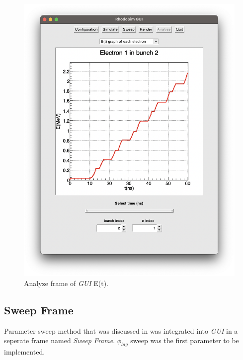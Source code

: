 \documentclass{book}
\begin{document}
\begin{figure}[h!]
    \centering
    \includegraphics[width=0.9\linewidth]{../../../figures/rhodoSim/GUI_analyze_Et_3.png}
    \caption{Analyze frame of \textit{GUI} E(t).}
    \label{fig:gui_analyze_Et}
    \vspace{20pt}
\end{figure}

\subsection{Sweep Frame}
Parameter sweep method that was discussed in  was integrated into \textit{GUI} in a seperate frame named \textit{Sweep Frame}.
$\phi_{lag}$ sweep was the first parameter to be implemented. 
\end{document}
